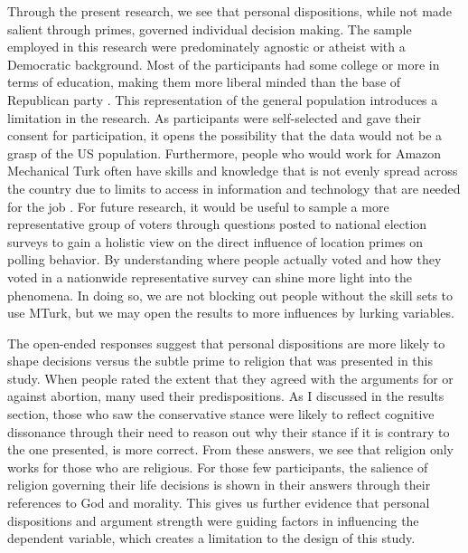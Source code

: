 \documentclass[letterpaper,man,natbib,noextraspace,12pt]{apa6}  %
\begin{document}
Through the present research, we see that personal dispositions, while not made salient through primes, governed individual decision making. The sample employed in this research were predominately agnostic or atheist with a Democratic background. Most of the participants had some college or more in terms of education, making them more liberal minded than the base of Republican party \citep{gelman_red_2010}. This representation of the general population introduces a limitation in the research. As participants were self-selected and gave their consent for participation, it opens the possibility that the data would not be a grasp of the US population. Furthermore, people who would work for Amazon Mechanical Turk often have skills and knowledge that is not evenly spread across the country due to limits to access in information and technology that are needed for the job \citep{hochschild2018strangers}. For future research, it would be useful to sample a more representative group of voters through questions posted to national election surveys to gain a holistic view on the direct influence of location primes on polling behavior. By understanding where people actually voted and how they voted in a nationwide representative survey can shine more light into the phenomena. In doing so, we are not blocking out people without the skill sets to use MTurk, but we may open the results to more influences by lurking variables. 

The open-ended responses suggest that personal dispositions are more likely to shape decisions versus the subtle prime to religion that was presented in this study. When people rated the extent that they agreed with the arguments for or against abortion, many used their predispositions. As I discussed in the results section, those who saw the conservative stance were likely to reflect cognitive dissonance through their need to reason out why their stance if it is contrary to the one presented, is more correct. From these answers, we see that religion only works for those who are religious. For those few participants, the salience of religion governing their life decisions is shown in their answers through their references to God and morality. This gives us further evidence that personal dispositions and argument strength were guiding factors in influencing the dependent variable, which creates a limitation to the design of this study.
\end{document}
